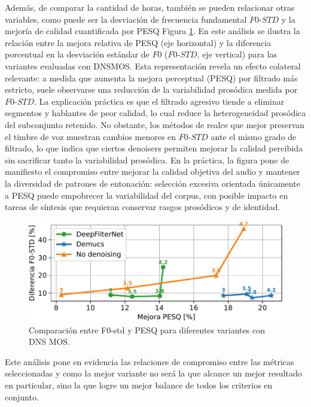 Además, de comparar la cantidad de horas, también se pueden relacionar otras variables, como puede ser la desviación de frecuencia fundamental \(F0\text{-}STD\) y la mejoría de calidad cuantificada por PESQ Figura \ref{fig:F0_vs_PESQ}. En este análisis se ilustra la relación entre la mejora relativa de PESQ (eje horizontal) y la diferencia porcentual en la desviación estándar de \(F0\) (\(F0\text{-}STD\), eje vertical) para las variantes evaluadas con DNSMOS. Esta representación revela un efecto colateral relevante: a medida que aumenta la mejora perceptual (PESQ) por filtrado más estricto, suele observarse una reducción de la variabilidad prosódica medida por \(F0\text{-}STD\). La explicación práctica es que el filtrado agresivo tiende a eliminar segmentos y hablantes de peor calidad, lo cual reduce la heterogeneidad prosódica del subconjunto retenido. No obstante, los métodos de realce que mejor preservan el timbre de voz muestran cambios menores en \(F0\text{-}STD\) ante el mismo grado de filtrado, lo que indica que ciertos denoisers permiten mejorar la calidad percibida sin sacrificar tanto la variabilidad prosódica. En la práctica, la figura pone de manifiesto el compromiso entre mejorar la calidad objetiva del audio y mantener la diversidad de patrones de entonación: selección excesiva orientada únicamente a PESQ puede empobrecer la variabilidad del corpus, con posible impacto en tareas de síntesis que requieran conservar rasgos prosódicos y de identidad.

\begin{figure}[h]
  \centering
  \centerline{\includegraphics[width=12cm]{Figuras/Pipeline/F0-STD vs PESQ (nisqa).pdf}}
  \caption{Comparación entre F0-std y PESQ para diferentes variantes con DNS MOS.}
    \label{fig:F0_vs_PESQ}
\end{figure}

Este análisis pone en evidencia las relaciones de compromiso entre las métricas seleccionadas y como la mejor variante no será la que alcance un mejor resultado en particular, sino la que logre un mejor balance de todos los criterios en conjunto.

